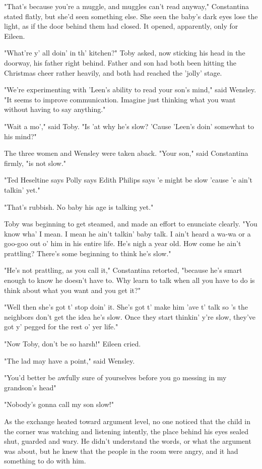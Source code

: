 "That's because you're a muggle, and muggles can't read anyway," Constantina stated flatly, but she'd seen something else. She seen the baby's dark eyes lose the light, as if the door behind them had closed. It opened, apparently, only for Eileen.

"What're y' all doin' in th' kitchen?" Toby asked, now sticking his head in the doorway, his father right behind. Father and son had both been hitting the Christmas cheer rather heavily, and both had reached the 'jolly' stage.

"We're experimenting with 'Leen's ability to read your son's mind," said Wensley. "It seems to improve communication. Imagine just thinking what you want without having to say anything."

"Wait a mo'," said Toby. "Is 'at why he's slow? 'Cause 'Leen's doin' somewhat to his mind?"

The three women and Wensley were taken aback. "Your son," said Constantina firmly, "is not slow."

"Ted Heseltine says Polly says Edith Philips says 'e might be slow 'cause 'e ain't talkin' yet."

"That's rubbish. No baby his age is talking yet."

Toby was beginning to get steamed, and made an effort to enunciate clearly. "You know wha' I mean. I mean he ain't talkin' baby talk. I ain't heard a wa-wa or a goo-goo out o' him in his entire life. He's nigh a year old. How come he ain't prattling? There's some beginning to think he's slow."

"He's not prattling, as you call it," Constantina retorted, "because he's smart enough to know he doesn't have to. Why learn to talk when all you have to do is think about what you want and you get it?"

"Well then she's got t' stop doin' it. She's got t' make him 'ave t' talk so 's the neighbors don't get the idea he's slow. Once they start thinkin' y're slow, they've got y' pegged for the rest o' yer life."

"Now Toby, don't be so harsh!" Eileen cried.

"The lad may have a point," said Wensley.

"You'd better be awfully sure of yourselves before you go messing in my grandson's head{\el}"

"Nobody's gonna call my son slow!"

As the exchange heated toward argument level, no one noticed that the child in the corner was watching and listening intently, the place behind his eyes sealed shut, guarded and wary. He didn't understand the words, or what the argument was about, but he knew that the people in the room were angry, and it had something to do with him.

